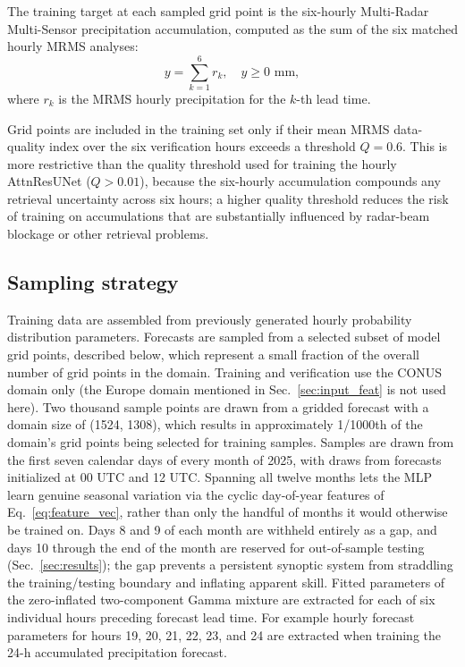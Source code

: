 \documentclass[11pt]{article}
\begin{document}
The training target at each sampled grid point is the six-hourly Multi-Radar
Multi-Sensor \citep[MRMS;][]{zhang2016} precipitation accumulation, computed 
as the sum of the six matched hourly MRMS analyses:
\begin{equation}
  y = \sum_{k=1}^{6} r_k, \quad y \geq 0 \text{ mm},
  \label{eq:target}
\end{equation}
where $r_k$ is the MRMS hourly precipitation for the $k$-th lead time.

Grid points are included in the training set only if their mean MRMS
data-quality index over the six verification hours exceeds a threshold
$Q = 0.6$.  This is more restrictive than the quality threshold used for
training the hourly AttnResUNet ($Q > 0.01$), because the six-hourly
accumulation compounds any retrieval uncertainty across six hours; a higher
quality threshold reduces the risk of training on accumulations that are
substantially influenced by radar-beam blockage or other retrieval problems.

\subsection{Sampling strategy}
\label{sec:sampling}

Training data are assembled from previously generated
hourly probability distribution parameters.  Forecasts are
sampled from a selected subset of model grid points, described below, which represent a small
fraction of the overall number of grid points in the domain.  Training and verification use the CONUS domain only (the Europe domain
mentioned in Sec.~\ref{sec:input_feat} is not used here).  Two thousand
sample points are drawn from a gridded forecast with a domain size of
(1524, 1308), which results in approximately
1/1000th of the domain's grid points being selected for training samples.  Samples are drawn
from the first seven calendar days of every month of 2025, with draws from forecasts
initialized at 00 UTC and 12 UTC.  Spanning all twelve months lets the MLP learn genuine
seasonal variation via the cyclic day-of-year features of
Eq.~\eqref{eq:feature_vec}, rather than only the handful of months it would
otherwise be trained on.  Days 8 and 9 of each month are withheld entirely as a
gap, and days 10 through the end of the month are reserved for out-of-sample
testing (Sec.~\ref{sec:results}); the gap prevents a persistent synoptic
system from straddling the training/testing boundary and inflating apparent
skill.  Fitted parameters of the zero-inflated two-component
Gamma mixture are extracted for each of six individual hours preceding forecast lead time.
For example hourly forecast parameters for hours 19, 20, 21, 22, 23, and 24 are extracted
when training the 24-h accumulated precipitation forecast.
\end{document}

